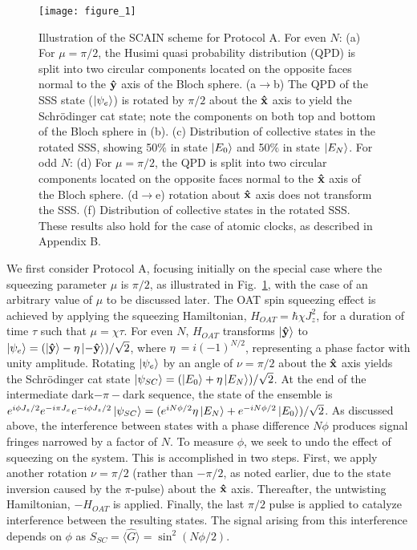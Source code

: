 \documentclass[aps,pra,letterpaper,superscriptaddress,showpacs,amsmath,floats,twocolumn]{revtex4-1}
\begin{document}
\begin{figure}[h]
\texttt{[image: figure\_1]}
\caption{Illustration of the SCAIN scheme for Protocol A. For even $N$: (a) For $\mu=\pi/2$, the Husimi quasi probability distribution (QPD) is split into two circular components located on the opposite faces normal to the $\vu{y}$ axis of the Bloch sphere. (a$\rightarrow$b) The QPD of the SSS state ($\ket{\psi_e}$) is rotated by $\pi/2$ about the $\vu{x}$ axis to yield the Schr\"odinger cat state; note the components on both top and bottom of the Bloch sphere in (b). (c) Distribution of collective states in the rotated SSS, showing 50$\%$ in state $\ket{E_0}$ and 50$\%$ in state $\ket{E_N}$. For odd $N$: (d) For $\mu= \pi/2$, the QPD is split into two circular components located on the opposite faces normal to the $\vu{x}$ axis of the Bloch sphere. (d$\rightarrow$e) rotation about $\vu{x}$ axis does not transform the SSS. (f) Distribution of collective states in the rotated SSS. These results also hold for the case of atomic clocks, as described in Appendix B.}
\label{fig:1}
\end{figure}
%

We first consider Protocol A, focusing initially on the special case where the squeezing parameter $\mu$ is $\pi/2$, as illustrated in Fig.~\ref{fig:1}, with the case of an arbitrary value of $\mu$ to be discussed later. The OAT spin squeezing effect is achieved by applying the squeezing Hamiltonian, $H_{OAT} =\hbar \chi J_z^2$, for a duration of time $\tau$ such that $\mu = \chi\tau$. For even $N$, $H_{OAT}$ transforms $\ket{\vu{y}}$ to $\ket{\psi_e}=(\ket{\vu{y}} -\eta \ket{-\vu{y}})/\sqrt{2}$, where $\eta \ = i(-1)^{N/2}$, representing a phase factor with unity amplitude. Rotating $\ket{\psi_e}$ by an angle of $\nu = \pi/2$ about the $\vu{x}$ axis yields the Schr\"odinger cat state $\ket{\psi_{SC}} = (\ket{E_0} + \eta \ket{E_N})/\sqrt{2}$. At the end of the intermediate dark$-\pi-$dark sequence, the state of the ensemble is $e^{i\phi J_z/2}e^{-i\pi J_x}e^{-i\phi J_z/2}\ket{\psi_{SC}} = (e^{iN\phi/2}\eta \ket{E_N} + e^{-iN\phi/2}\ket{E_0})/\sqrt{2}$. As discussed above, the interference between states with a phase difference $N\phi$ produces signal fringes narrowed by a factor of $N$. To measure $\phi$, we seek to undo the effect of squeezing on the system. This is accomplished in two steps. First, we apply another rotation $\nu = \pi/2$ (rather than $-\pi/2$, as noted earlier, due to the state inversion caused by the $\pi$-pulse) about the $\vu{x}$ axis. Thereafter, the untwisting Hamiltonian, $-H_{OAT}$ is applied. Finally, the last $\pi/2$ pulse is applied to catalyze interference between the resulting states. The signal arising from this interference depends on $\phi$ as $S_{SC} =\langle\hat{G}\rangle= \sin^2(N\phi/2)$.
\end{document}
